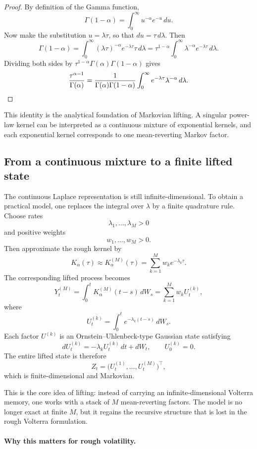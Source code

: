 \begin{proof}
By definition of the Gamma function,
\[
\Gamma(1-\alpha)=\int_0^\infty u^{-\alpha}e^{-u}\,du.
\]
Now make the substitution \(u=\lambda \tau\), so that \(du=\tau\,d\lambda\). Then
\[
\Gamma(1-\alpha)
=
\int_0^\infty (\lambda\tau)^{-\alpha}e^{-\lambda\tau}\tau\,d\lambda
=
\tau^{1-\alpha}\int_0^\infty \lambda^{-\alpha}e^{-\lambda\tau}\,d\lambda.
\]
Dividing both sides by \(\tau^{1-\alpha}\Gamma(\alpha)\Gamma(1-\alpha)\) gives
\[
\frac{\tau^{\alpha-1}}{\Gamma(\alpha)}
=
\frac{1}{\Gamma(\alpha)\Gamma(1-\alpha)}
\int_0^\infty e^{-\lambda\tau}\lambda^{-\alpha}\,d\lambda.
\qedhere
\]
\end{proof}

This identity is the analytical foundation of Markovian lifting. A singular power-law kernel can be interpreted as a continuous mixture of exponential kernels, and each exponential kernel corresponds to one mean-reverting Markov factor.

\subsection{From a continuous mixture to a finite lifted state}

The continuous Laplace representation is still infinite-dimensional. To obtain a practical model, one replaces the integral over \(\lambda\) by a finite quadrature rule. Choose rates
\[
\lambda_1,\dots,\lambda_M>0
\]
and positive weights
\[
w_1,\dots,w_M>0.
\]
Then approximate the rough kernel by
\[
K_\alpha(\tau)\approx K_\alpha^{(M)}(\tau)
=
\sum_{k=1}^M w_k e^{-\lambda_k \tau}.
\]
The corresponding lifted process becomes
\[
Y_t^{(M)}
=
\int_0^t K_\alpha^{(M)}(t-s)\,dW_s
=
\sum_{k=1}^M w_k U_t^{(k)},
\]
where
\[
U_t^{(k)}
=
\int_0^t e^{-\lambda_k(t-s)}\,dW_s.
\]
Each factor \(U^{(k)}\) is an Ornstein--Uhlenbeck-type Gaussian state satisfying
\[
dU_t^{(k)}=-\lambda_k U_t^{(k)}\,dt + dW_t,
\qquad
U_0^{(k)}=0.
\]
The entire lifted state is therefore
\[
Z_t=\bigl(U_t^{(1)},\dots,U_t^{(M)}\bigr)^\top,
\]
which is finite-dimensional and Markovian.

This is the core idea of lifting: instead of carrying an infinite-dimensional Volterra memory, one works with a stack of \(M\) mean-reverting factors. The model is no longer exact at finite \(M\), but it regains the recursive structure that is lost in the rough Volterra formulation.

\paragraph{Why this matters for rough volatility.}

